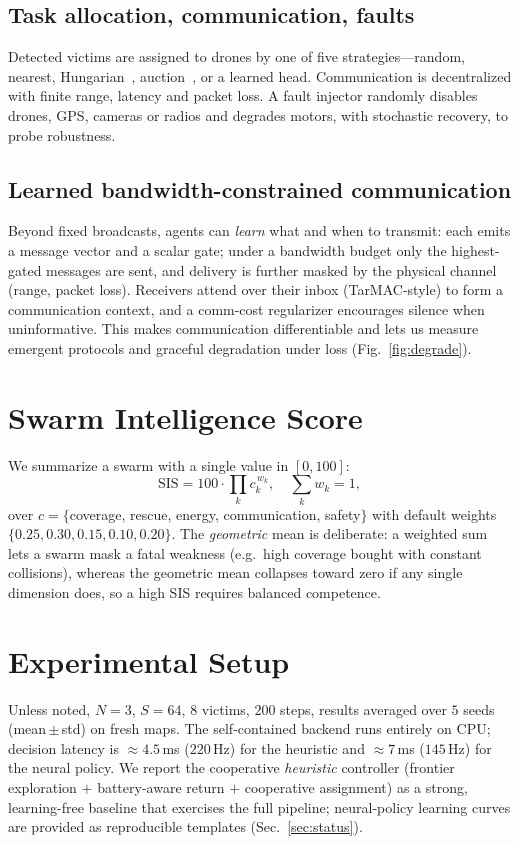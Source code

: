 \documentclass[twocolumn,10pt]{article}
\begin{document}
\subsection{Task allocation, communication, faults}
Detected victims are assigned to drones by one of five strategies---random,
nearest, Hungarian~\cite{kuhn1955hungarian}, auction~\cite{bertsekas1988auction},
or a learned head. Communication is decentralized with finite range, latency and
packet loss. A fault injector randomly disables drones, GPS, cameras or radios and
degrades motors, with stochastic recovery, to probe robustness.

\subsection{Learned bandwidth-constrained communication}
Beyond fixed broadcasts, agents can \emph{learn} what and when to transmit: each emits a message vector and a scalar gate; under a bandwidth budget only the highest-gated messages are sent, and delivery is further masked by the physical channel (range, packet loss). Receivers attend over their inbox (TarMAC-style) to form a communication context, and a comm-cost regularizer encourages silence when uninformative. This makes communication differentiable and lets us measure emergent protocols and graceful degradation under loss (Fig.~\ref{fig:degrade}).

\section{Swarm Intelligence Score}
We summarize a swarm with a single value in $[0,100]$:
\begin{equation}
\mathrm{SIS} = 100 \cdot \prod_{k} c_k^{\,w_k}, \quad \sum_k w_k = 1,
\end{equation}
over $c=\{$coverage, rescue, energy, communication, safety$\}$ with default weights
$\{0.25,0.30,0.15,0.10,0.20\}$. The \emph{geometric} mean is deliberate: a weighted
sum lets a swarm mask a fatal weakness (e.g.\ high coverage bought with constant
collisions), whereas the geometric mean collapses toward zero if any single
dimension does, so a high SIS requires balanced competence.

\section{Experimental Setup}
Unless noted, $N=3$, $S=64$, $8$ victims, $200$ steps, results averaged over $5$
seeds (mean\,$\pm$\,std) on fresh maps. The self-contained backend runs entirely on
CPU; decision latency is $\approx 4.5$\,ms ($220$\,Hz) for the heuristic and
$\approx 7$\,ms ($145$\,Hz) for the neural policy. We report the cooperative
\emph{heuristic} controller (frontier exploration $+$ battery-aware return $+$
cooperative assignment) as a strong, learning-free baseline that exercises the full
pipeline; neural-policy learning curves are provided as reproducible templates
(Sec.~\ref{sec:status}).
\end{document}
